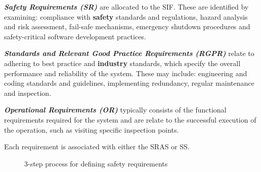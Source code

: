 \documentclass[conference]{IEEEtran}
\begin{document}
\begin{compactitem}
    \item \textbf{\textit{Safety Requirements (SR)}} are allocated to the SIF. These are identified by examining: compliance with \textbf{safety} standards and regulations, hazard analysis and risk assessment, fail-safe mechanisms, emergency shutdown procedures and safety-critical software development practices. 

    \item \textbf{\textit{Standards and Relevant Good Practice Requirements (RGPR)}} relate to adhering to best practice and \textbf{industry} standards, which specify the overall performance and reliability of the system. These may include: engineering and coding standards and guidelines, implementing redundancy, regular maintenance and inspection.

    \item \textbf{\textit{Operational Requirements (OR)}} typically consists of the functional requirements required for the system and are relate to the successful execution of the operation, such as  visiting specific inspection points.
\end{compactitem}

\noindent Each requirement is associated with either the SRAS or SS.

\begin{figure}[t]    
    \caption{3-step process for defining safety requirements%
    \label{Fig:Process}}
\end{figure}
\end{document}
